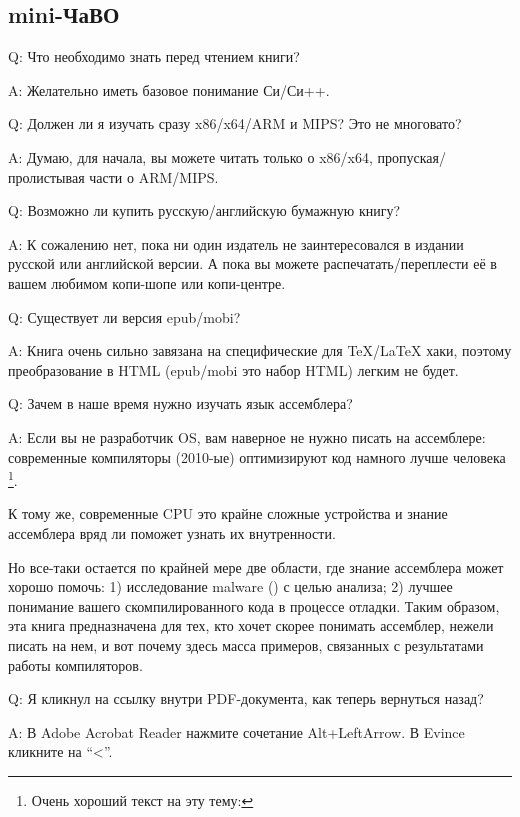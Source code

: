 \subsection*{mini-ЧаВО}

\par Q: Что необходимо знать перед чтением книги?
\par A: Желательно иметь базовое понимание Си/Си++.

\par Q: Должен ли я изучать сразу x86/x64/ARM и MIPS? Это не многовато?
\par A: Думаю, для начала, вы можете читать только о x86/x64, пропуская/пролистывая части о ARM/MIPS.

\par Q: Возможно ли купить русскую/английскую бумажную книгу?
\par A: К сожалению нет, пока ни один издатель не заинтересовался в издании русской или английской версии.
А пока вы можете распечатать/переплести её в вашем любимом копи-шопе или копи-центре.

\par Q: Существует ли версия epub/mobi?
\par A: Книга очень сильно завязана на специфические для TeX/LaTeX хаки, поэтому преобразование в HTML (epub/mobi это набор HTML)
легким не будет.

\par Q: Зачем в наше время нужно изучать язык ассемблера?
\par A: Если вы не разработчик \ac{OS}, вам наверное не нужно писать на ассемблере: современные компиляторы (2010-ые) оптимизируют код намного лучше человека
\footnote{Очень хороший текст на эту тему: \InSqBrackets{\AgnerFog}}.

К тому же, современные \ac{CPU} это крайне сложные устройства и знание ассемблера вряд ли
поможет узнать их внутренности.

Но все-таки остается по крайней мере две области, где знание ассемблера может хорошо помочь:
1) исследование malware () с целью анализа; 2) лучшее понимание
вашего скомпилированного кода в процессе отладки.
Таким образом, эта книга предназначена для тех, кто хочет скорее понимать ассемблер,
нежели писать на нем, и вот почему здесь масса примеров, связанных с результатами
работы компиляторов.

\par Q: Я кликнул на ссылку внутри PDF-документа, как теперь вернуться назад?
\par A: В Adobe Acrobat Reader нажмите сочетание Alt+LeftArrow. В Evince кликните на ``<''.

